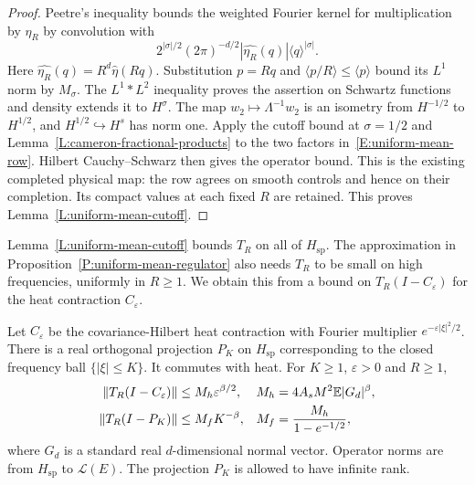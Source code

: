 \begin{proof}
  Peetre's inequality bounds the weighted Fourier kernel for multiplication by
  $\eta_R$ by convolution with
  \[
    2^{|\sigma|/2}(2\pi)^{-d/2}
    |\widehat{\eta_R}(q)|\langle q\rangle^{|\sigma|}.
  \]
  Here $\widehat{\eta_R}(q) = R^d\widehat{\eta}(Rq)$. Substitution $p = Rq$ and
  $\langle p/R\rangle \le \langle p\rangle$ bound its $L^1$ norm by $M_\sigma$.
  The $L^1*L^2$ inequality proves the assertion on Schwartz functions and
  density extends it to $H^\sigma$. The map $w_2\mapsto\Lambda^{-1}w_2$ is an
  isometry from $H^{-1/2}$ to $H^{1/2}$, and $H^{1/2}\hookrightarrow H^s$ has
  norm one. Apply the cutoff bound at $\sigma = 1/2$ and
  Lemma~\ref{L:cameron-fractional-products} to the two factors
  in~\eqref{E:uniform-mean-row}. Hilbert Cauchy--Schwarz then gives the operator
  bound. This is the existing completed physical map: the row agrees on smooth
  controls and hence on their completion. Its compact values at each fixed $R$
  are retained. This proves Lemma~\ref{L:uniform-mean-cutoff}.
\end{proof}

Lemma~\ref{L:uniform-mean-cutoff} bounds $T_R$ on all of $H_{\mathrm{sp}}$.
The approximation in Proposition~\ref{P:uniform-mean-regulator} also needs
$T_R$ to be small on high frequencies, uniformly in $R \ge 1$. We obtain this
from a bound on $T_R(I-C_\varepsilon)$ for the heat contraction
$C_\varepsilon$.

\begin{lemma}
  \label{L:uniform-mean-spatial-tails}
  Let $C_\varepsilon$ be the covariance-Hilbert heat contraction with Fourier
  multiplier $e^{-\varepsilon|\xi|^2/2}$. There is a real orthogonal projection
  $P_K$ on $H_{\mathrm{sp}}$ corresponding to the closed frequency ball
  $\{|\xi|\le K\}$. It commutes with heat. For $K \ge 1$, $\varepsilon > 0$ and
  $R \ge 1$,
  \begin{align}
    \|T_R(I-C_\varepsilon)\|
    &\le M_h\varepsilon^{\beta/2},
    &M_h&=4A_sM^2\mathbb{E}|G_d|^\beta,\label{E:uniform-mean-heat}\\
    \|T_R(I-P_K)\|
    &\le M_fK^{-\beta},
    &M_f&=\frac{M_h}{1-e^{-1/2}},\label{E:uniform-mean-frequency}
  \end{align}
  where $G_d$ is a standard real $d$-dimensional normal vector. Operator norms
  are from $H_{\mathrm{sp}}$ to $\mathcal{L}(E)$. The projection $P_K$ is
  allowed to have infinite rank.
\end{lemma}

